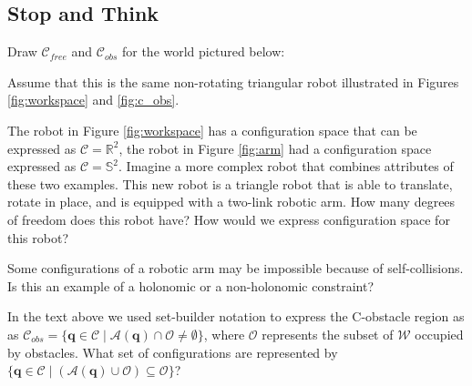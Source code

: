 \subsection*{Stop and Think}

\begin{exercise}
  Draw  $\mathcal{C}_{free}$ and $\mathcal{C}_{obs}$ for the world pictured below:

  \begin{center}
\end{center}
  
  Assume that this is the same non-rotating triangular robot
  illustrated in Figures \ref{fig:workspace} and \ref{fig:c_obs}.
\end{exercise}

\begin{exercise}

  The robot in Figure \ref{fig:workspace} has a configuration space
  that can be expressed as $\mathcal{C} = \mathbb{R}^2$, the robot in
  Figure \ref{fig:arm} had a configuration space expressed as
  $\mathcal{C} = \mathbb{S}^2$.  Imagine a more complex robot that
  combines attributes of these two examples.  This new robot is a
  triangle robot that is able to translate, rotate in place, and is
  equipped with a two-link robotic arm.  How many degrees of freedom
  does this robot have?  How would we express configuration space for
  this robot?
\end{exercise}

\begin{exercise}
Some configurations of a robotic arm may be impossible because of
self-collisions.  Is this an example of a holonomic or a
  non-holonomic constraint?
\end{exercise}

\begin{exercise}
In the text above we used set-builder notation to express the
C-obstacle region as as $\mathcal{C}_{obs} = \{\mathbf{q} \in
\mathcal{C} \mid \mathcal{A}(\mathbf{q}) \cap \mathcal{O} \neq
\emptyset\}$, where $\mathcal{O}$ represents the subset of
$\mathcal{W}$ occupied by obstacles.  What set of configurations are represented by  $\{\mathbf{q} \in
\mathcal{C} \mid ( \mathcal{A}(\mathbf{q}) \cup \mathcal{O}) \subseteq
\mathcal{O}\}$?
  \end{exercise}

